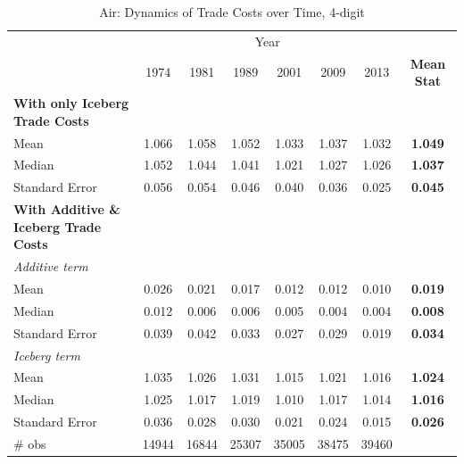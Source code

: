 \documentclass[a4paper,11pt]{article}
\begin{document}
\begin{table}[htbp]
  \centering
  \caption{Air: Dynamics of Trade Costs over Time, 4-digit}
\begin{center}
    \begin{tabular}{lccccccc}

   \hline\hline
          & \multicolumn{6}{c}{Year}                      &  \\


& 1974  & 1981  & 1989  & 2001  & 2009  & 2013  & \textbf{Mean Stat}\\

\hline
\textbf{With only Iceberg Trade Costs} &       &       &       &       &       &       &  \\
Mean  & 1.066 & 1.058 & 1.052 & \multicolumn{1}{c}{1.033} & \multicolumn{1}{c}{1.037} & \multicolumn{1}{c}{1.032} & \multicolumn{1}{c}{\textbf{1.049}} \\
Median & 1.052 & 1.044 & 1.041 & \multicolumn{1}{c}{1.021} & \multicolumn{1}{c}{1.027} & \multicolumn{1}{c}{1.026} & \multicolumn{1}{c}{\textbf{1.037}} \\
Standard Error & 0.056 & 0.054 & 0.046 & \multicolumn{1}{c}{0.040} & \multicolumn{1}{c}{0.036} & \multicolumn{1}{c}{0.025} & \multicolumn{1}{c}{\textbf{0.045}} \\
\hline
\textbf{With Additive \& Iceberg Trade Costs } &       &       &       &       &       &       & \textbf{} \\
\textit{Additive term} &       &       &       &       &       &       & \multicolumn{1}{c}{\textbf{}} \\
Mean  & 0.026 & 0.021 & 0.017 & \multicolumn{1}{c}{0.012} & \multicolumn{1}{c}{0.012} & \multicolumn{1}{c}{0.010} & \multicolumn{1}{c}{\textbf{0.019}} \\
Median & 0.012 & 0.006 & 0.006 & \multicolumn{1}{c}{0.005} & \multicolumn{1}{c}{0.004} & \multicolumn{1}{c}{0.004} & \multicolumn{1}{c}{\textbf{0.008}} \\
Standard Error & 0.039 & 0.042 & 0.033 & \multicolumn{1}{c}{0.027} & \multicolumn{1}{c}{0.029} & \multicolumn{1}{c}{0.019} & \multicolumn{1}{c}{\textbf{0.034}} \\
\textit{Iceberg term} &       &       &       &       &       &       & \textbf{} \\
Mean  & 1.035 & 1.026 & 1.031 & \multicolumn{1}{c}{1.015} & \multicolumn{1}{c}{1.021} & \multicolumn{1}{c}{1.016} & \multicolumn{1}{c}{\textbf{1.024}} \\
Median & 1.025 & 1.017 & 1.019 & \multicolumn{1}{c}{1.010} & \multicolumn{1}{c}{1.017} & \multicolumn{1}{c}{1.014} & \multicolumn{1}{c}{\textbf{1.016}} \\
Standard Error & 0.036 & 0.028 & 0.030 & \multicolumn{1}{c}{0.021} & \multicolumn{1}{c}{0.024} & \multicolumn{1}{c}{0.015} & \multicolumn{1}{c}{\textbf{0.026}} \\
\hline
\# obs & 14944 & 16844 & 25307 & \multicolumn{1}{c}{35005} & \multicolumn{1}{c}{38475} & \multicolumn{1}{c}{39460} & \multicolumn{1}{c}{\textbf{}} \\


\end{tabular}
\end{center}
\end{table}
\end{document}
